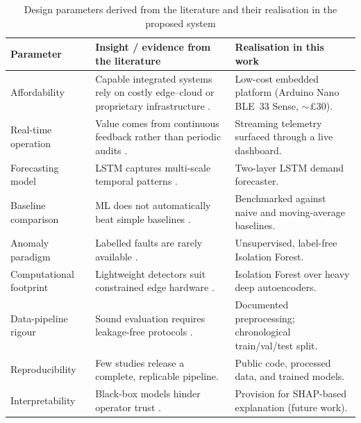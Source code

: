 \documentclass[conference]{IEEEtran}
\begin{document}
\begin{table}[t]
\centering
\caption{Design parameters derived from the literature and their realisation in
the proposed system}
\label{tab:params}
\small
\renewcommand{\arraystretch}{1.3}
\begin{tabular}{|p{3.0cm}|p{9.4cm}|p{4.2cm}|}
\hline
\textbf{Parameter} & \textbf{Insight / evidence from the literature} &
\textbf{Realisation in this work}\\
\hline
Affordability &
Capable integrated systems rely on costly edge--cloud or proprietary
infrastructure \cite{bin2022real,silva2023iot}. &
Low-cost embedded platform (Arduino Nano BLE~33 Sense, $\sim$\pounds30).\\
\hline
Real-time operation &
Value comes from continuous feedback rather than periodic audits
\cite{hafeez2020efficient,bin2022real}. &
Streaming telemetry surfaced through a live dashboard.\\
\hline
Forecasting model &
LSTM captures multi-scale temporal patterns
\cite{hochreiter1997long,kong2017short}. &
Two-layer LSTM demand forecaster.\\
\hline
Baseline comparison &
ML does not automatically beat simple baselines
\cite{makridakis2018statistical}. &
Benchmarked against naive and moving-average baselines.\\
\hline
Anomaly paradigm &
Labelled faults are rarely available
\cite{himeur2021artificial,jesmeen2021unsupervised}. &
Unsupervised, label-free Isolation Forest.\\
\hline
Computational footprint &
Lightweight detectors suit constrained edge hardware
\cite{jamshidi2025lightweight}. &
Isolation Forest over heavy deep autoencoders.\\
\hline
Data-pipeline rigour &
Sound evaluation requires leakage-free protocols
\cite{makridakis2018statistical}. &
Documented preprocessing; chronological train/val/test split.\\
\hline
Reproducibility &
Few studies release a complete, replicable pipeline. &
Public code, processed data, and trained models.\\
\hline
Interpretability &
Black-box models hinder operator trust \cite{lundberg2017unified}. &
Provision for SHAP-based explanation (future work).\\
\hline
\end{tabular}
\end{table}
 
\end{document}
